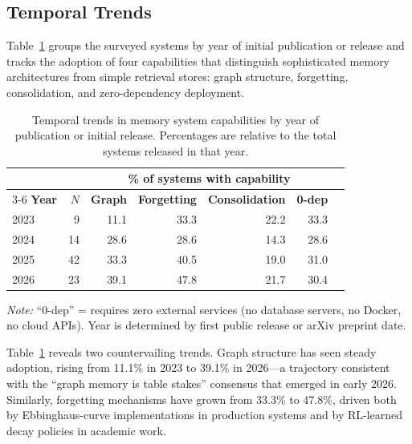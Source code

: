 \subsection{Temporal Trends}
\label{sec:temporal-trends}

Table~\ref{tab:temporal-trends} groups the surveyed systems by year of initial
publication or release and tracks the adoption of four capabilities that
distinguish sophisticated memory architectures from simple retrieval stores:
graph structure, forgetting, consolidation, and zero-dependency deployment.

\begin{table}[!t]
\centering
\caption{Temporal trends in memory system capabilities by year of publication or initial release. Percentages are relative to the total systems released in that year.}
\label{tab:temporal-trends}
\small
\begin{tabular}{@{}lrrrrrr@{}}
\toprule
& & \multicolumn{4}{c}{\textbf{\% of systems with capability}} \\
\cmidrule(l){3-6}
\textbf{Year} & \textbf{$N$} & \textbf{Graph} & \textbf{Forgetting} & \textbf{Consolidation} & \textbf{0-dep} \\
\midrule
2023 &  9 & 11.1 & 33.3 & 22.2 & 33.3 \\
2024 & 14 & 28.6 & 28.6 & 14.3 & 28.6 \\
2025 & 42 & 33.3 & 40.5 & 19.0 & 31.0 \\
2026 & 23 & 39.1 & 47.8 & 21.7 & 30.4 \\
\bottomrule
\end{tabular}
\vspace{0.3em}
\begin{flushleft}
\footnotesize
\textit{Note:} ``0-dep'' = requires zero external services (no database servers, no Docker, no cloud APIs). Year is determined by first public release or arXiv preprint date.
\end{flushleft}
\end{table}

Table~\ref{tab:temporal-trends} reveals two countervailing trends. Graph
structure has seen steady adoption, rising from 11.1\% in 2023 to 39.1\% in
2026---a trajectory consistent with the ``graph memory is table stakes''
consensus that emerged in early 2026. Similarly, forgetting mechanisms have
grown from 33.3\% to 47.8\%, driven both by Ebbinghaus-curve implementations in
production systems and by RL-learned decay policies in academic work.

